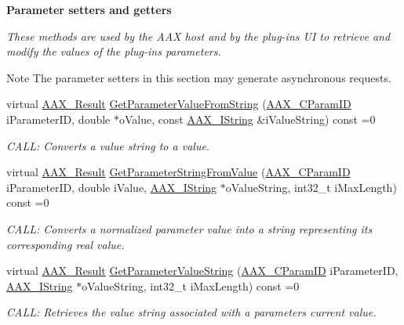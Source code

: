 \begin{Indent}{\bf Parameter setters and getters}\par
{\em These methods are used by the A\+A\+X host and by the plug-\/in\textquotesingle{}s U\+I to retrieve and modify the values of the plug-\/in\textquotesingle{}s parameters.

\begin{DoxyNote}{Note}
The parameter setters in this section may generate asynchronous requests. 
\end{DoxyNote}
}\begin{DoxyCompactItemize}
\item 
virtual \hyperlink{a00149_a4d8f69a697df7f70c3a8e9b8ee130d2f}{A\+A\+X\+\_\+\+Result} \hyperlink{a00061_a54bb12c9798e4f9a3a5b5d6f30ace992}{Get\+Parameter\+Value\+From\+String} (\hyperlink{a00149_a1440c756fe5cb158b78193b2fc1780d1}{A\+A\+X\+\_\+\+C\+Param\+I\+D} i\+Parameter\+I\+D, double $\ast$o\+Value, const \hyperlink{a00113}{A\+A\+X\+\_\+\+I\+String} \&i\+Value\+String) const =0
\begin{DoxyCompactList}\small\item\em C\+A\+L\+L\+: Converts a value string to a value. \end{DoxyCompactList}\item 
virtual \hyperlink{a00149_a4d8f69a697df7f70c3a8e9b8ee130d2f}{A\+A\+X\+\_\+\+Result} \hyperlink{a00061_add995f2eb5a3967c48dd9f3e21f003aa}{Get\+Parameter\+String\+From\+Value} (\hyperlink{a00149_a1440c756fe5cb158b78193b2fc1780d1}{A\+A\+X\+\_\+\+C\+Param\+I\+D} i\+Parameter\+I\+D, double i\+Value, \hyperlink{a00113}{A\+A\+X\+\_\+\+I\+String} $\ast$o\+Value\+String, int32\+\_\+t i\+Max\+Length) const =0
\begin{DoxyCompactList}\small\item\em C\+A\+L\+L\+: Converts a normalized parameter value into a string representing its corresponding real value. \end{DoxyCompactList}\item 
virtual \hyperlink{a00149_a4d8f69a697df7f70c3a8e9b8ee130d2f}{A\+A\+X\+\_\+\+Result} \hyperlink{a00061_aacb54e6522561fe91fe12d0d99734abf}{Get\+Parameter\+Value\+String} (\hyperlink{a00149_a1440c756fe5cb158b78193b2fc1780d1}{A\+A\+X\+\_\+\+C\+Param\+I\+D} i\+Parameter\+I\+D, \hyperlink{a00113}{A\+A\+X\+\_\+\+I\+String} $\ast$o\+Value\+String, int32\+\_\+t i\+Max\+Length) const =0
\begin{DoxyCompactList}\small\item\em C\+A\+L\+L\+: Retrieves the value string associated with a parameter\textquotesingle{}s current value. \end{DoxyCompactList}\item 

\end{DoxyCompactItemize}
\end{Indent}

